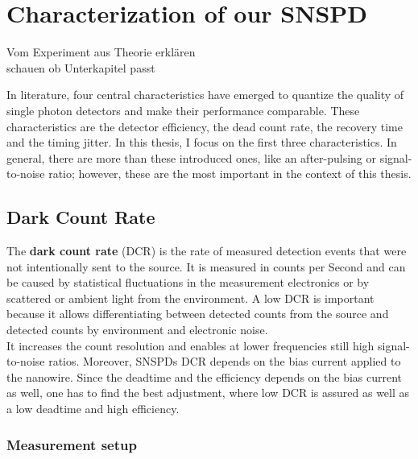 
\graphicspath{{/Users/maxim.re/Studium/Physik B.Sc./Semester_8_SS24/Proseminar/Figs Single Photon Detection/}}

\chapter{Characterization of our SNSPD}
\label{sec:SNSPD_Characterization}
Vom Experiment aus Theorie erklären \\ schauen ob Unterkapitel passt


In literature, four central characteristics have emerged to quantize the quality of single photon detectors and
make their performance comparable.
These characteristics are the detector efficiency, the dead count rate, the recovery time and the timing jitter.
In this thesis, I focus on the first three characteristics.
In general, there are more than these introduced ones,
like an after-pulsing or signal-to-noise ratio; however, these are the most important in the context of this thesis.

\section{Dark Count Rate}
The \textbf{dark count rate} (DCR) is the rate of measured detection events that were not intentionally sent to the source.
It is measured in counts per Second and can be caused by statistical fluctuations in the measurement electronics
or by scattered or ambient light from the environment.
A low DCR is important because it allows differentiating between detected counts from the source and detected counts by
environment and electronic noise. \\
It increases the count resolution and enables at lower frequencies still high signal-to-noise ratios.
Moreover, SNSPDs DCR depends on the bias current applied to the nanowire.
Since the deadtime and the efficiency depends on the bias current as well, one has to find the best adjustment,
where low DCR is assured as well as a low deadtime and high efficiency.


\subsection*{Measurement setup}


